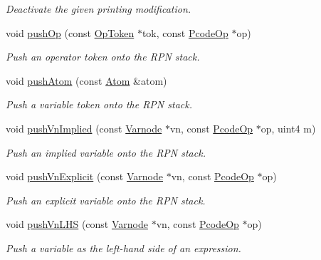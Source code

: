 \begin{DoxyCompactItemize}
\begin{DoxyCompactList}\small\item\em Deactivate the given printing modification. \end{DoxyCompactList}\item 
void \mbox{\hyperlink{class_print_language_abe1affc823865f4379d27121c39e5880}{push\+Op}} (const \mbox{\hyperlink{class_op_token}{Op\+Token}} $\ast$tok, const \mbox{\hyperlink{class_pcode_op}{Pcode\+Op}} $\ast$op)
\begin{DoxyCompactList}\small\item\em Push an operator token onto the R\+PN stack. \end{DoxyCompactList}\item 
void \mbox{\hyperlink{class_print_language_abeb8a9774fbf1dcb700be292a7e10be8}{push\+Atom}} (const \mbox{\hyperlink{struct_print_language_1_1_atom}{Atom}} \&atom)
\begin{DoxyCompactList}\small\item\em Push a variable token onto the R\+PN stack. \end{DoxyCompactList}\item 
void \mbox{\hyperlink{class_print_language_a5979bdf12bfe420ae6bba713bc3d7faf}{push\+Vn\+Implied}} (const \mbox{\hyperlink{class_varnode}{Varnode}} $\ast$vn, const \mbox{\hyperlink{class_pcode_op}{Pcode\+Op}} $\ast$op, uint4 m)
\begin{DoxyCompactList}\small\item\em Push an implied variable onto the R\+PN stack. \end{DoxyCompactList}\item 
void \mbox{\hyperlink{class_print_language_a6ec07b77be217d86b77ec5fec2919b08}{push\+Vn\+Explicit}} (const \mbox{\hyperlink{class_varnode}{Varnode}} $\ast$vn, const \mbox{\hyperlink{class_pcode_op}{Pcode\+Op}} $\ast$op)
\begin{DoxyCompactList}\small\item\em Push an explicit variable onto the R\+PN stack. \end{DoxyCompactList}\item 
void \mbox{\hyperlink{class_print_language_a955ef5ecf066b283738b23abe925f67c}{push\+Vn\+L\+HS}} (const \mbox{\hyperlink{class_varnode}{Varnode}} $\ast$vn, const \mbox{\hyperlink{class_pcode_op}{Pcode\+Op}} $\ast$op)
\begin{DoxyCompactList}\small\item\em Push a variable as the left-\/hand side of an expression. \end{DoxyCompactList}\item 

\end{DoxyCompactItemize}
